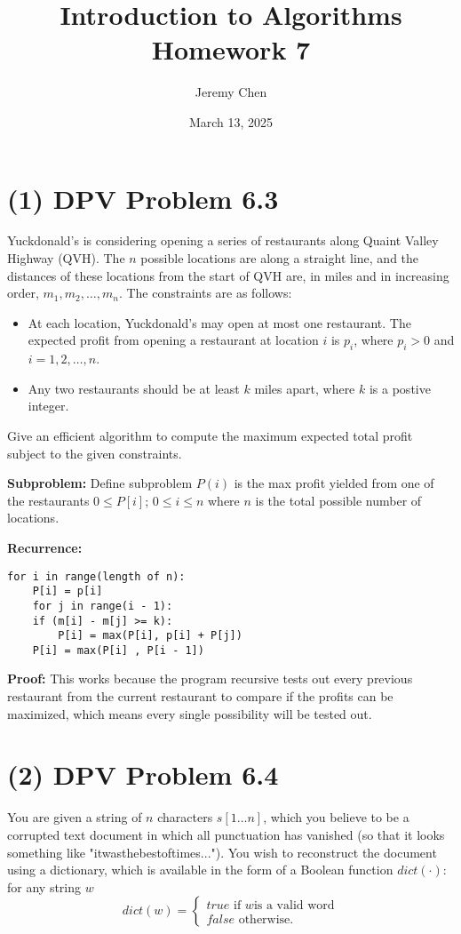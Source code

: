 \documentclass[10pt,letterpaper]{article}
\title{Introduction to Algorithms Homework 7}
\author{Jeremy Chen}
\date{March 13, 2025}
\begin{document}
	\maketitle
	
\section*{(1) DPV Problem 6.3}
\noindent Yuckdonald's is considering opening a series of restaurants along Quaint Valley Highway (QVH). The $n$ possible locations are along a straight line, and the distances of these locations from the start of QVH are, in miles and in increasing order, $m_{1}, m_{2}, \dots, m_{n}$. The constraints are as follows:
\begin{itemize}
	\item At each location, Yuckdonald's may open at most one restaurant. The expected profit from opening a restaurant at location $i$ is $p_{i}$, where $p_{i} > 0$ and $i = 1, 2, \dots, n$. 
	\item Any two restaurants should be at least $k$ miles apart, where $k$ is a postive integer.
\end{itemize}
Give an efficient algorithm to compute the maximum expected total profit subject to the given constraints. 

\textbf{Subproblem:} Define subproblem $P(i)$ is the max profit yielded from one of the restaurants $0 \leq P[i]$; $0 \leq i \leq n $ where $n$ is the total possible number of locations.

\textbf{Recurrence:} 
\begin{lstlisting}
for i in range(length of n):
	P[i] = p[i]
	for j in range(i - 1):
	if (m[i] - m[j] >= k):
		P[i] = max(P[i], p[i] + P[j])
	P[i] = max(P[i]	, P[i - 1])
\end{lstlisting}

\textbf{Proof:} This works because the program recursive tests out every previous restaurant from the current restaurant to compare if the profits can be maximized, which means every single possibility will be tested out.

\section*{(2) DPV Problem 6.4}
\noindent You are given a string of $n$ characters $s[1 \dots n]$, which you believe to be a corrupted text document in which all punctuation has vanished (so that it looks something like "itwasthebestoftimes..."). You wish to reconstruct the document using a dictionary, which is available in the form of a Boolean function $dict(\cdot)$: for any string $w$
$$dict(w) = \begin{cases}
true \text{      if } w \text{is a valid word} \\
false \text{      otherwise}.
\end{cases}$$
\end{document}
